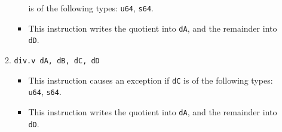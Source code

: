 \documentclass{article}
\begin{document}
\begin{itemize}
\begin{enumerate}
\begin{itemize}
					is of the following types: \texttt{u64}, \texttt{s64}.
				\item This instruction writes the quotient into
					\texttt{dA}, and the remainder into \texttt{dD}.
				\end{itemize}
			\item \texttt{div.v dA, dB, dC, dD}
				\begin{itemize}
				\item This instruction causes an exception if \texttt{dC}
					is of the following types: \texttt{u64}, \texttt{s64}.
				\item This instruction writes the quotient into
					\texttt{dA}, and the remainder into \texttt{dD}.
				\end{itemize}
			\end{enumerate}
		\end{itemize}
		\newpage
\end{document}
